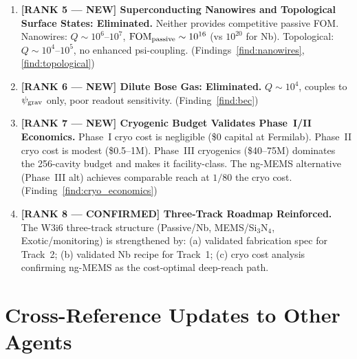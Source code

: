 \documentclass[11pt]{article}
\theoremstyle{definition}
\theoremstyle{remark}
\newcommand{\psigrav}{\psi_{\rm grav}}
\newcommand{\FOMpassive}{\mathrm{FOM}_{\rm passive}}
\begin{document}
\begin{enumerate}
  \item \textbf{[RANK 5 --- NEW] Superconducting Nanowires and
    Topological Surface States: Eliminated.}
    Neither provides competitive passive FOM. Nanowires:
    $Q \sim 10^6$--$10^7$, $\FOMpassive \sim 10^{16}$ (vs $10^{20}$
    for Nb). Topological: $Q \sim 10^4$--$10^5$, no enhanced psi-coupling.
    (Findings~\ref{find:nanowires}, \ref{find:topological})

  \item \textbf{[RANK 6 --- NEW] Dilute Bose Gas: Eliminated.}
    $Q \sim 10^4$, couples to $\psigrav$ only, poor readout sensitivity.
    (Finding~\ref{find:bec})

  \item \textbf{[RANK 7 --- NEW] Cryogenic Budget Validates Phase~I/II
    Economics.}
    Phase~I cryo cost is negligible (\$0 capital at Fermilab).
    Phase~II cryo cost is modest (\$0.5--1M). Phase~III cryogenics
    (\$40--75M) dominates the 256-cavity budget and makes it
    facility-class. The ng-MEMS alternative (Phase~III alt) achieves
    comparable reach at $1/80$ the cryo cost.
    (Finding~\ref{find:cryo_economics})

  \item \textbf{[RANK 8 --- CONFIRMED] Three-Track Roadmap Reinforced.}
    The W3i6 three-track structure (Passive/Nb, MEMS/Si$_3$N$_4$,
    Exotic/monitoring) is strengthened by: (a) validated fabrication
    spec for Track~2; (b) validated Nb recipe for Track~1; (c) cryo
    cost analysis confirming ng-MEMS as the cost-optimal deep-reach
    path.
\end{enumerate}


\section{Cross-Reference Updates to Other Agents}
\label{sec:cross_ref}
\end{document}
